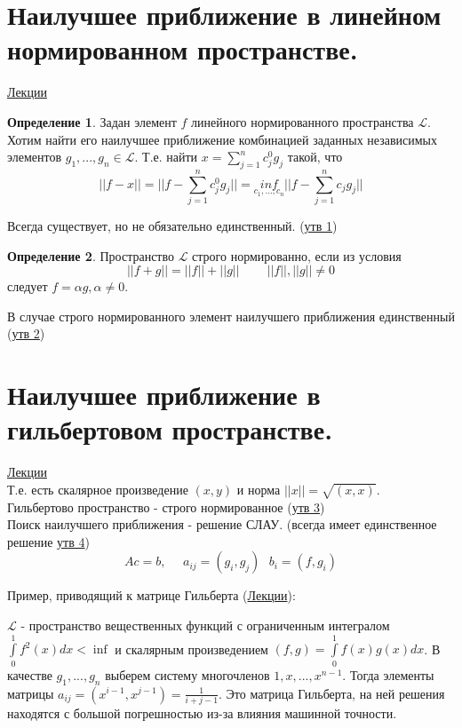 \documentclass[specialist, subf, href, colorlinks=true, 12pt, times, mtpro, final]{disser}
\theoremstyle{definition}
\newtheorem{defn}{Определение}[section]
\begin{document}
	
	

\section {Наилучшее приближение в линейном нормированном пространстве.}
	\hyperlink {lects.28}{Лекции}\\
	\begin{defn}
	Задан элемент $f$ линейного нормированного пространства $\mathcal{L}$. Хотим найти его наилучшее приближение комбинацией заданных независимых элементов $g_1, ..., g_n \in \mathcal{L}$. Т.е. найти $x = \sum\limits_{j = 1}^{n}c_j^0g_j$ такой, что
	$$
		||f - x|| = ||f - \sum\limits_{j = 1}^{n}c_j^0g_j|| = \underset{c_1,...,c_n}{inf} ||f - \sum\limits_{j = 1}^{n}c_jg_j||
	$$
	\end{defn}

	Всегда существует, но не обязательно единственный. (\hyperlink {lects.28}{утв 1})
	
	\begin{defn}  
		Пространство $\mathcal{L}$ строго нормированно, если из условия
		$$
			||f+g|| = ||f||+||g|| \ \ \ \ \ \ \ \ \ \ ||f||,||g|| \ne 0
		$$
		следует $f = \alpha g, \alpha \ne 0$.
	\end{defn}

	В случае строго нормированного элемент наилучшего приближения единственный (\hyperlink {lects.29}{утв 2})

\section {Наилучшее приближение в гильбертовом пространстве.}
	\hyperlink {lects.29}{Лекции}\\
	Т.е. есть скалярное произведение $(x,y)$ и норма $||x||=\sqrt{(x,x)}$. \\
	Гильбертово пространство - строго нормированное (\hyperlink {lects.29}{утв 3}) \\
	
	Поиск наилучшего приближения - решение СЛАУ. (всегда имеет единственное решение \hyperlink {lects.30}{утв 4})
	$$
		Ac = b, \ \ \ \ \ \ a_{ij} = (g_i, g_j) \ \ \ b_i = (f, g_i)
	$$
	
	Пример, приводящий к матрице Гильберта (\hyperlink {lects.31}{Лекции}):
	
	$\mathcal{L}$ - пространство вещественных функций с ограниченным интегралом $\int\limits_0^1 f^2(x)dx < \inf $ и скалярным произведением $(f,g) = \int\limits_0^1 f(x)g(x)dx$. В качестве $g_1, ..., g_n$ выберем систему многочленов $1, x, ..., x^{n-1}$. Тогда элементы матрицы $a_{ij} = (x^{i-1},x^{j-1}) = \frac{1}{i+j-1}$. Это матрица Гильберта, на ней решения находятся с большой погрешностью из-за влияния машинной точности. 
\end{document}
